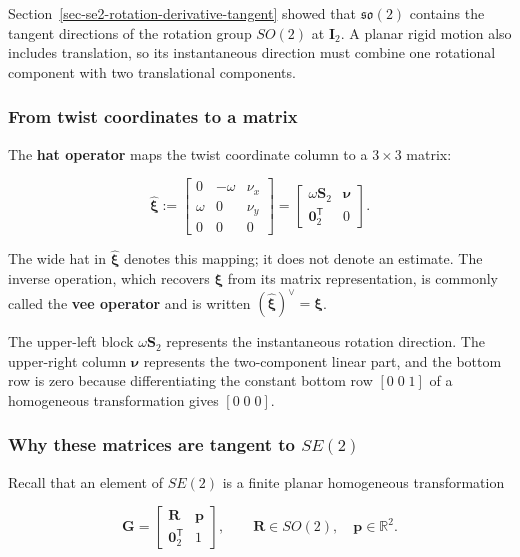 \documentclass[
  australian,
  12pt,
  letterpaper,
  DIV=11,
  numbers=noendperiod,
  twoside]{scrreprt}
\begin{document}
Section~\ref{sec-se2-rotation-derivative-tangent} showed that
\(\mathfrak{so}(2)\) contains the tangent directions of the rotation
group \(SO(2)\) at \(\mathbf I_2\). A planar rigid motion also includes
translation, so its instantaneous direction must combine one rotational
component with two translational components.

\subsubsection{From twist coordinates to a
matrix}\label{from-twist-coordinates-to-a-matrix}

The \textbf{hat operator} maps the twist coordinate column to a
\(3\times3\) matrix:

\[
\boxed{
\widehat{\boldsymbol\xi}
\mathrel{:=}
\begin{bmatrix}
0&-\omega&\nu_x\\
\omega&0&\nu_y\\
0&0&0
\end{bmatrix}
=
\begin{bmatrix}
\omega\mathbf S_2&\boldsymbol\nu\\
\mathbf 0_2^\mathsf T&0
\end{bmatrix}
}.
\]

The wide hat in \(\widehat{\boldsymbol\xi}\) denotes this mapping; it
does not denote an estimate. The inverse operation, which recovers
\(\boldsymbol\xi\) from its matrix representation, is commonly called
the \textbf{vee operator} and is written
\((\widehat{\boldsymbol\xi})^\vee=\boldsymbol\xi\).

The upper-left block \(\omega\mathbf S_2\) represents the instantaneous
rotation direction. The upper-right column \(\boldsymbol\nu\) represents
the two-component linear part, and the bottom row is zero because
differentiating the constant bottom row \([0\;0\;1]\) of a homogeneous
transformation gives \([0\;0\;0]\).

\subsubsection{\texorpdfstring{Why these matrices are tangent to
\(SE(2)\)}{Why these matrices are tangent to SE(2)}}\label{why-these-matrices-are-tangent-to-se2}

Recall that an element of \(SE(2)\) is a finite planar homogeneous
transformation

\[
\mathbf G
=
\begin{bmatrix}
\mathbf R&\mathbf p\\
\mathbf 0_2^\mathsf T&1
\end{bmatrix},
\qquad
\mathbf R\in SO(2),
\quad
\mathbf p\in\mathbb R^2.
\]
\end{document}
